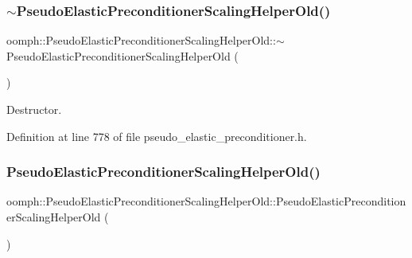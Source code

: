 \subsubsection{\texorpdfstring{$\sim$\+Pseudo\+Elastic\+Preconditioner\+Scaling\+Helper\+Old()}{~PseudoElasticPreconditionerScalingHelperOld()}}
{\footnotesize\ttfamily oomph\+::\+Pseudo\+Elastic\+Preconditioner\+Scaling\+Helper\+Old\+::$\sim$\+Pseudo\+Elastic\+Preconditioner\+Scaling\+Helper\+Old (\begin{DoxyParamCaption}{ }\end{DoxyParamCaption})\hspace{0.3cm}{\ttfamily [inline]}}



Destructor. 



Definition at line 778 of file pseudo\+\_\+elastic\+\_\+preconditioner.\+h.

\mbox{\label{classoomph_1_1PseudoElasticPreconditionerScalingHelperOld_acfd02d4f3aa04aa04485f2cc8678de5f}} 
\subsubsection{\texorpdfstring{Pseudo\+Elastic\+Preconditioner\+Scaling\+Helper\+Old()}{PseudoElasticPreconditionerScalingHelperOld()}\hspace{0.1cm}{\footnotesize\ttfamily [2/2]}}
{\footnotesize\ttfamily oomph\+::\+Pseudo\+Elastic\+Preconditioner\+Scaling\+Helper\+Old\+::\+Pseudo\+Elastic\+Preconditioner\+Scaling\+Helper\+Old (\begin{DoxyParamCaption}\item[{const \hyperlink{classoomph_1_1PseudoElasticPreconditionerScalingHelperOld}{Pseudo\+Elastic\+Preconditioner\+Scaling\+Helper\+Old} \&}]{ }\end{DoxyParamCaption})\hspace{0.3cm}{\ttfamily [inline]}}



